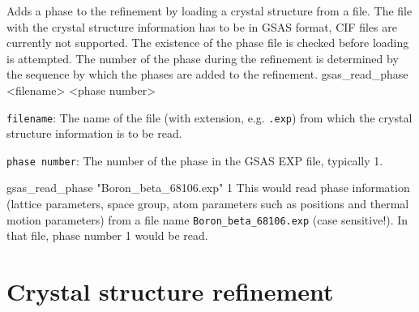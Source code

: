 {
Adds a phase to the refinement by loading a crystal structure from a file. The file with the crystal structure information has to be in GSAS format, CIF files are currently not supported. The existence of the phase file is checked before loading is attempted. The number of the phase during the refinement is determined by the sequence by which the phases are added to the refinement.
}{
gsas\_read\_phase <filename> <phase number>
}{
\item \texttt{filename}: The name of the file (with extension, e.g. \texttt{.exp}) from which the crystal structure information is to be read.
\item \texttt{phase number}: The number of the phase in the GSAS EXP file, typically 1.
}{
gsas\_read\_phase "Boron\_beta\_68106.exp" 1
}{
This would read phase information (lattice parameters, space group, atom parameters such as positions and thermal motion parameters) from a file name \texttt{Boron\_beta\_68106.exp} (case sensitive!). In that file, phase number 1 would be read.
}

\section{Crystal structure refinement}

